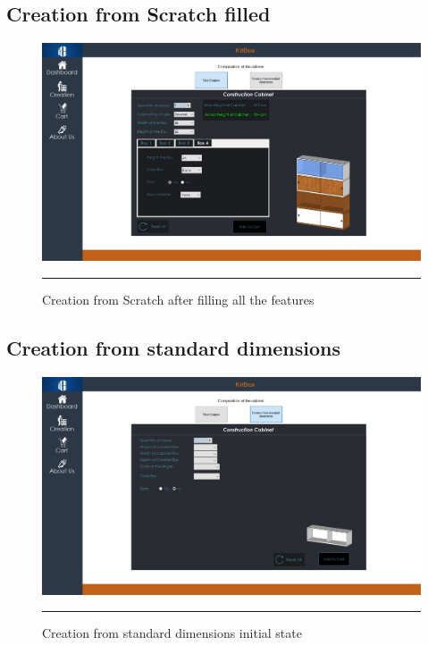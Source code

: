	\newpage
	\subsection{Creation from Scratch filled}
    	\vfill
        \begin{figure}[h!]
            \centering
    		\includegraphics[width =1.2\textwidth,angle = 90]{Figures/CreationScratchFilled.PNG}
    		\rule{35em}{0.5pt}
    		\caption{Creation from Scratch after filling all the features}
    		\label{scratchtab}
    	\end{figure}
    	\vfill
    	
	\newpage
	\subsection{Creation from standard dimensions}
    	\vfill
        \begin{figure}[h!]
            \centering
    		\includegraphics[height=110truemm,angle = 90]{Figures/CreationStandard.PNG}
    		\rule{35em}{0.5pt}
    		\caption{Creation from standard dimensions initial state}
    		\label{standardtab}
    	\end{figure}
    	\vfill
    	
